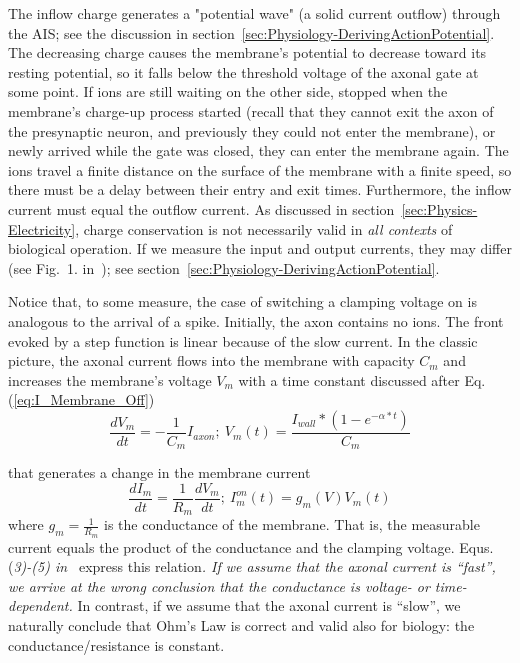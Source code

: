 The inflow charge generates a "potential wave" (a solid current outflow) through the \gls{AIS};
see the discussion in section~\ref{sec:Physiology-DerivingActionPotential}.
The decreasing charge causes the membrane's potential to decrease
toward its resting potential, so it falls below the threshold voltage
of the axonal gate at some point. If ions are still waiting on the
other side, stopped when the membrane's charge-up process started
(recall that they cannot exit the axon of the presynaptic neuron, and previously they could
not enter the membrane), or newly arrived while the gate was closed,
they can enter the membrane again.
The ions travel a finite distance on the surface of the membrane with
a finite speed, so there must be a delay between their entry and exit times. Furthermore,
the inflow current must equal the outflow current. As discussed in
section~\ref{sec:Physics-Electricity}, charge conservation
is not necessarily valid in \emph{all contexts} of biological operation.
If we measure the input and output currents, they may differ (see
Fig.~1. in~\cite{ActionPotentialGenerationNatrium:2008}); see section~\ref{sec:Physiology-DerivingActionPotential}.

Notice that, to some measure, the case of switching a clamping voltage
on is analogous to the arrival of a spike. Initially, the axon contains
no ions. The front evoked by a step function is linear because of
the slow current. In the classic picture, the axonal current flows into the membrane with
capacity $C_{m}$ and increases the membrane's voltage $V_{m}$
with a time constant discussed after Eq.(\ref{eq:I_Membrane_Off})
\begin{equation}
	\frac{dV_{m}}{dt}=-\frac{1}{C_{m}}I_{axon};\ V_{m}(t)=\frac{I_{wall}*(1-e^{-\alpha*t})}{C_{m}}\label{eq:MembraneCurrent}
\end{equation}

\noindent that generates a change in the membrane current
\begin{equation}
	\frac{dI_{m}}{dt}=\frac{1}{R_{m}}\frac{dV_{m}}{dt};\ I_{m}^{on}(t)=g_{m}(V)V_{m}(t)\label{eq:TimeDependentConductance}
\end{equation}
\noindent where $g_{m}=\frac{1}{R_{m}}$ is the conductance of the
membrane. That is, the measurable current equals the product of the conductance
and the clamping voltage. Equs.(\emph{3)-(5) in~\cite{HodgkinHuxley:1952}}
express this relation\emph{. If we assume that the axonal current
	is ``fast'', we arrive at the wrong conclusion that the conductance
	is voltage- or time-dependent.}
In contrast, if we assume that the axonal current is ``slow'',
we naturally conclude that Ohm's Law is correct and valid also for
biology: the conductance/resistance is constant.

